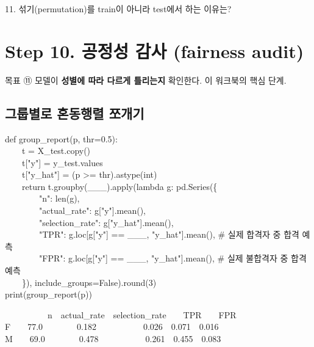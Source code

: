 \documentclass[11pt,a4paper]{article}
\begin{document}
\begin{qbox}
11. 섞기(permutation)를 train이 아니라 test에서 하는 이유는?
\end{qbox}

\section{Step 10. 공정성 감사 (fairness audit)}
\begin{goalbox}{목표 \quad ⑪}
모델이 \textbf{성별에 따라 다르게 틀리는지} 확인한다. 이 워크북의 핵심 단계.
\end{goalbox}

\subsection{그룹별로 혼동행렬 쪼개기}
\begin{codebox}
def group\_report(p, thr=0.5):\\
\ \ \ \ t = X\_test.copy()\\
\ \ \ \ t["y"] = y\_test.values\\
\ \ \ \ t["y\_hat"] = (p >= thr).astype(int)\\
\ \ \ \ return t.groupby(\_\_\_).apply(lambda g: pd.Series(\{\\
\ \ \ \ \ \ \ \ "n": len(g),\\
\ \ \ \ \ \ \ \ "actual\_rate": g["y"].mean(),\\
\ \ \ \ \ \ \ \ "selection\_rate": g["y\_hat"].mean(),\\
\ \ \ \ \ \ \ \ "TPR": g.loc[g["y"] == \_\_\_, "y\_hat"].mean(), \hfill \# 실제 합격자 중 합격 예측\\
\ \ \ \ \ \ \ \ "FPR": g.loc[g["y"] == \_\_\_, "y\_hat"].mean(), \hfill \# 실제 불합격자 중 합격 예측\\
\ \ \ \ \}), include\_groups=False).round(3)\\
print(group\_report(p))
\end{codebox}
\begin{outbox}
\ \ \ \ \ \ \ \ \ \ n\ \ actual\_rate\ \ selection\_rate\ \ \ \ TPR\ \ \ \ FPR\\
F\ \ \ \ 77.0\ \ \ \ \ \ \ \ 0.182\ \ \ \ \ \ \ \ \ \ \ 0.026\ \ 0.071\ \ 0.016\\
M\ \ \ \ 69.0\ \ \ \ \ \ \ \ 0.478\ \ \ \ \ \ \ \ \ \ \ 0.261\ \ 0.455\ \ 0.083
\end{outbox}
\end{document}
